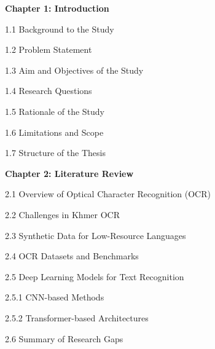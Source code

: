 \begin{adjustwidth}{0.2cm}{0.2cm}
    \vspace{0.5cm}
    {\large \textbf{Chapter 1: Introduction}\dotfill\pageref{ch:intro}\par}
    {\large 1.1 Background to the Study\dotfill\pageref{sec:background}\par}
    {\large 1.2 Problem Statement\dotfill\pageref{sec:problem}\par}
    {\large 1.3 Aim and Objectives of the Study\dotfill\pageref{sec:objectives}\par}
    {\large 1.4 Research Questions\dotfill\pageref{sec:questions}\par}
    {\large 1.5 Rationale of the Study\dotfill\pageref{sec:rationale}\par}
    {\large 1.6 Limitations and Scope\dotfill\pageref{sec:limitations}\par}
    {\large 1.7 Structure of the Thesis\dotfill\pageref{sec:structure}\par}

    \vspace{0.5cm}
    {\large \textbf{Chapter 2: Literature Review}\dotfill\pageref{ch:literature}\par}
    {\large 2.1 Overview of Optical Character Recognition (OCR)\dotfill\pageref{sec:ocr-overview}\par}
    {\large 2.2 Challenges in Khmer OCR\dotfill\pageref{sec:khmer-challenges}\par}
    {\large 2.3 Synthetic Data for Low-Resource Languages\dotfill\pageref{sec:synthetic-data}\par}
    {\large 2.4 OCR Datasets and Benchmarks\dotfill\pageref{sec:datasets}\par}
    {\large 2.5 Deep Learning Models for Text Recognition\dotfill\pageref{sec:dl-models}\par}
    {\large \hspace{1cm}2.5.1 CNN-based Methods\dotfill\pageref{subsec:cnn}\par}
    {\large \hspace{1cm}2.5.2 Transformer-based Architectures\dotfill\pageref{subsec:transformer}\par}
    {\large 2.6 Summary of Research Gaps\dotfill\pageref{sec:gaps}\par}


\end{adjustwidth}
